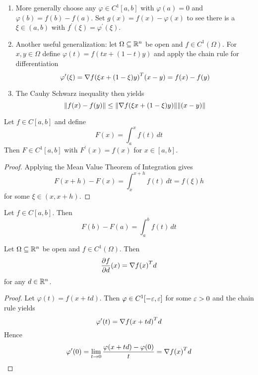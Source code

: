 \begin{remark}\hfill
    \begin{enumerate}
        \item More generally choose any \( \varphi \in C^1[a,b] \) with \( \varphi(a) = 0 \) and 
            \( \varphi(b) = f(b) - f(a) \). Set \( g(x) = f(x) - \varphi(x) \) to see there is a \( \xi \in (a,b) \) 
            with \( f^\prime(\xi) = \varphi^\prime(\xi)\). 
        \item Another useful generalization: let \( \Omega \subseteq \mathbb{R}^n \) be open and \( f \in C^1(\Omega) \). For
            \( x, y \in \Omega \) define \( \varphi(t) = f(tx + (1 - t)y) \) and apply the chain rule for differentiation
            \[
                 \varphi^\prime(\xi) = \nabla {f(\xi x + (1 - \xi)y)}^T(x - y) = f(x) - f(y)
            \]
        \item The Cauhy Schwarz inequality then yields
            \[
                  \|f(x) - f(y)\| \le \|\nabla f(\xi x + (1 - \xi)y)\| \|(x - y)\|
            \]
    \end{enumerate}
\end{remark}
\bigskip

\begin{theorem}\label{thm:differentiation}
Let \( f \in C[a,b] \) and define 
\[
    F(x) = \int_a^x f(t)\,dt
\]
Then \( F \in C^1[a,b] \) with \( F^\prime(x) = f(x) \) for \( x \in [a,b] \).
\end{theorem}

\begin{proof}
Applying the Mean Value Theorem of Integration gives
\[
    F(x + h) - F(x) =  \int_x^{x + h} f(t)\,dt = f(\xi) h
\]
for some \( \xi \in (x, x + h) \).
\end{proof}
\bigskip

\begin{theorem}\label{thm:fund_calculus}
Let \( f \in C[a,b] \). Then
\[
    F(b) -F(a) = \int_a^b f(t)\,dt
\]
\end{theorem}

\begin{lemma}\label{lemma:directional_derivative}
Let \( \Omega \subseteq \mathbb{R}^n \) be open and \( f \in C^1(\Omega) \). Then
\[
    \frac{\partial f}{\partial d}(x) = \nabla{f(x)}^T d
\]
for any \( d \in \mathbb{R}^n \).
\end{lemma}

\begin{proof}
Let \( \varphi(t) = f(x + td) \). Then \( \varphi \in C^1[-\varepsilon, \varepsilon ] \) for some \( \varepsilon > 0 \) 
and the chain rule yields \[ \varphi^\prime(t) = {\nabla f(x + td)}^T d \]
Hence
\[
    \varphi^\prime(0) = \lim_{t \to 0} \frac{\varphi(x + td) - \varphi(0)}{t} = {\nabla f(x)}^T d
\]
\end{proof}
\bigskip

